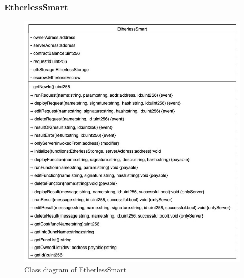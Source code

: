 \subsubsection{EtherlessSmart}
	\begin{figure}[H]
		\centering
		\includegraphics[width=0.6\linewidth]{diagrammi/etherless-smart/EtherlessSmart.jpg}
		\caption{Class diagram of EtherlessSmart}
	\end{figure}

